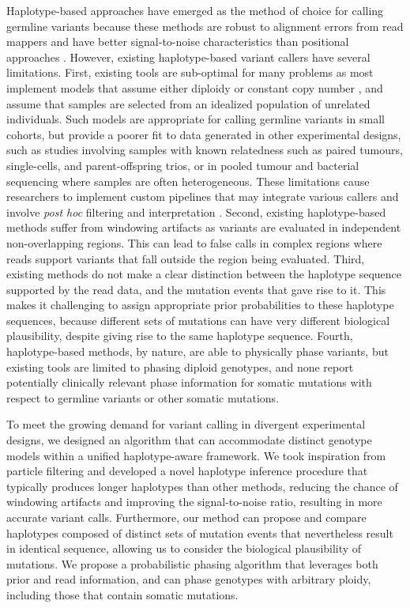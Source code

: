 \documentclass[notitlepage, twocolumn, 10pt]{article}
\begin{document}
\noindent Haplotype-based approaches have emerged as the method of choice for calling germline variants because these methods are robust to alignment errors from read mappers and have better signal-to-noise characteristics than positional approaches \cite{RN5, RN604, RN619, RN141, RN538, RN598, RN166}. However, existing haplotype-based variant callers have several limitations. First, existing tools are sub-optimal for many problems as most implement models that assume either diploidy \cite{RN5, RN604, RN619} or constant copy number \cite{RN141, RN538, RN598}, and assume that samples are selected from an idealized population of unrelated individuals. Such models are appropriate for calling germline variants in small cohorts, but  provide a poorer fit to data generated in other experimental designs, such as studies involving samples with known relatedness such as paired tumours, single-cells, and parent-offspring trios, or in pooled tumour and bacterial sequencing where samples are often heterogeneous. These limitations cause researchers to implement custom pipelines that may integrate various callers and involve \textit{post hoc} filtering and interpretation \cite{RN156, RN361, RN373, RN276, RN3, RN514, RN541, RN572, RN540}. 
Second, existing haplotype-based methods suffer from windowing artifacts as variants are evaluated in independent non-overlapping regions. This can lead to false calls in complex regions where reads support variants that fall outside the region being evaluated. Third, existing methods do not make a clear distinction between the haplotype sequence supported by the read data, and the mutation events that gave rise to it. This makes it challenging to assign appropriate prior probabilities to these haplotype sequences, because different sets of mutations can have very different biological plausibility, despite giving rise to the same haplotype sequence. 
Fourth, haplotype-based methods, by nature, are able to physically phase variants, but existing tools are limited to phasing diploid genotypes, and none report potentially clinically relevant \cite{RN211} phase information for somatic mutations with respect to germline variants or other somatic mutations.

To meet the growing demand for variant calling in divergent experimental designs, we designed an algorithm that can accommodate distinct genotype models within a unified haplotype-aware framework. We took inspiration from particle filtering \cite{Doucet11atutorial} and developed a novel haplotype inference procedure that typically produces longer haplotypes than other methods, reducing the chance of windowing artifacts and improving the signal-to-noise ratio, resulting in more accurate variant calls. Furthermore, our method can propose and compare haplotypes composed of distinct sets of mutation events that nevertheless result in identical sequence, allowing us to consider the biological plausibility of mutations. We propose a probabilistic phasing algorithm that leverages both prior and read information, and can phase genotypes with arbitrary ploidy, including those that contain somatic mutations. 
\end{document}
